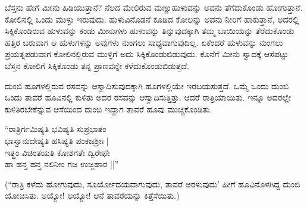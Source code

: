 ಬೆಸ್ತನು ಹೇಗೆ ಮೀನು ಹಿಡಿಯುತ್ತಾನೆ? ನೆಲದ ಮೇಲಿರುವ ಮಣ್ಣುಹುಳುವನ್ನು ಅವನು ತೆಗೆದುಕೊಂಡು ಹೋಗುತ್ತಾನೆ. ಕೋಲಿನಲ್ಲಿ ಒಂದು ಮುಳ್ಳು ಇರುವುದು. ಹುಳುವಿನೊಡನೆ ಕೂಡಿದ ಕೋಲನ್ನು ಅವನು ನೀರಿಗೆ ಹಾಕುತ್ತಾನೆ, ಅದರಲ್ಲಿ ಸಿಕ್ಕಿಕೊಂಡಿರುವ ಹುಳುವನ್ನು ಕಂಡು ಮೀನುಗಳು ಹುಳುವನ್ನು ತಿನ್ನುವುದಕ್ಕಾಗಿ ತಮ್ಮ ಬಾಯಿಯನ್ನು ತೆರೆದುಕೊಂಡು ಹತ್ತಿರ ಬರುವಾಗ ಆ ಹುಳುಗಳನ್ನು ಅವುಗಳು ನುಂಗಲು ಸಾಧ್ಯವಾಗುವುದಿಲ್ಲ. ಏಕೆಂದರೆ ಹುಳುವನ್ನು ನುಂಗಲು ಪ್ರಯತ್ನಪಡುವಾಗ ಕೋಲಿನಲ್ಲಿರುವ ಮುಳ್ಳಿಗೆ ಅದು ಸಿಕ್ಕಿಕೊಂಡುಬಿಡುವುದು. ಕೊನೆಗೆ ಮೀನು ಸ್ವಾದಕ್ಕೆ ಆಸೆಪಟ್ಟು ಬೆಸ್ತನ ಕೋಲಿಗೆ ಸಿಕ್ಕಿಕೊಂಡು ತನ್ನ ಪ್ರಾಣವನ್ನೇ ಕಳೆದುಕೊಂಡುಬಿಡುತ್ತದೆ.

ದುಂಬಿ ಹೂಗಳಲ್ಲಿರುವ ರಸವನ್ನು ಆಸ್ವಾದಿಸುವುದಕ್ಕಾಗಿ ಹೂಗಳಲ್ಲಿಯೇ ಇರಬಯಸುತ್ತದೆ. ಒಮ್ಮೆ ಒಂದು ದುಂಬಿ ಒಂದು ತಾವರೆ ಹೂವಿನಲ್ಲಿ ಕುಳಿತು ಅದರ ರಸವನ್ನು ಆಸ್ವಾದಿಸುತ್ತಿತ್ತು. ಆದರೆ ರಾತ್ರಿಯಾಯಿತು. ಇನ್ನೂ ಅದರಲ್ಲೇ ಕುಳಿತಿರಬೇಕೆನ್ನುವ ಆಸೆಯಿಂದ ದುಂಬಿ ಇದ್ದಾಗ ತಾವರೆ ಹೂವು ಮುಚ್ಚಿಕೊಂಡಿತು.

\begin{shloka}
``ರಾತ್ರಿರ್ಗಮಿಷ್ಯತಿ ಭವಿಷ್ಯತಿ ಸುಪ್ರಭಾತಂ\\
ಭಾಸ್ವಾನುದೇಷ್ಯತಿ ಹಸಿಷ್ಯತಿ ಪಂಕಜಶ್ರೀಃ‌ |\\
ಇತ್ಥಂ ವಿಚಿಂತಯತಿ ಕೋಶಗತೇ ದ್ವಿರೇಫೇ\\
ಹಾ ಹನ್ತ ಹನ್ತ ನಲಿನೀಂ ಗಜ ಉಜ್ಜಹಾರ ||''
\end{shloka}

(``ರಾತ್ರಿ ಕಳೆದು ಹೋಗುವುದು, ಸೂರ್ಯೋದಯವಾಗುವುದು, ತಾವರೆ ಅರಳುವುದು' ಹೀಗೆ ಹೂವಿನೊಳಗಿದ್ದ ದುಂಬಿ ಯೋಚಿಸಿತು. ಅಯ್ಯೋ! ಅಯ್ಯೋ! ಆನೆ ತಾವರೆಯನ್ನು ಕಿತ್ತೆಸೆಯಿತು.)






































































































